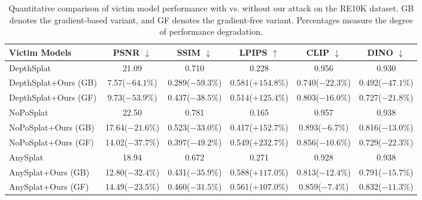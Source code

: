\begin{table}[h]
\centering
\caption{Quantitative comparison of victim model performance with vs. without our attack on the RE10K dataset. GB denotes the gradient-based variant, and GF denotes the gradient-free variant. Percentages measure the degree of performance degradation.}
\label{tab:re10k}
{\fontsize{7pt}{8pt}\selectfont
\begin{tabular}{l ccccc}
\toprule
Victim Models & \cellcolor{gray!20}PSNR $\downarrow$ & \cellcolor{gray!20}SSIM $\downarrow$ & \cellcolor{gray!20}LPIPS $\uparrow$ & \cellcolor{gray!20}CLIP $\downarrow$ & \cellcolor{gray!20}DINO $\downarrow$ \\
\midrule
DepthSplat           & 21.09 & 0.710 & 0.228 & 0.956 & 0.930 \\
DepthSplat+Ours (GB) & 7.57\textcolor[HTML]{B7282E}{\tiny($-64.1\%$)} & 0.289\textcolor[HTML]{B7282E}{\tiny($-59.3\%$)} & 0.581\textcolor[HTML]{B7282E}{\tiny($+154.8\%$)} & 0.740\textcolor[HTML]{B7282E}{\tiny($-22.3\%$)} & 0.492\textcolor[HTML]{B7282E}{\tiny($-47.1\%$)} \\
DepthSplat+Ours (GF) & 9.73\textcolor[HTML]{B7282E}{\tiny($-53.9\%$)}  & 0.437\textcolor[HTML]{B7282E}{\tiny($-38.5\%$)} & 0.514\textcolor[HTML]{B7282E}{\tiny($+125.4\%$)} & 0.803\textcolor[HTML]{B7282E}{\tiny($-16.0\%$)} & 0.727\textcolor[HTML]{B7282E}{\tiny($-21.8\%$)} \\
\midrule
NoPoSplat            & 22.50 & 0.781 & 0.165 & 0.957 & 0.938 \\
NoPoSplat+Ours (GB)  & 17.64\textcolor[HTML]{B7282E}{\tiny($-21.6\%$)} & 0.523\textcolor[HTML]{B7282E}{\tiny($-33.0\%$)} & 0.417\textcolor[HTML]{B7282E}{\tiny($+152.7\%$)} & 0.893\textcolor[HTML]{B7282E}{\tiny($-6.7\%$)} & 0.816\textcolor[HTML]{B7282E}{\tiny($-13.0\%$)} \\
NoPoSplat+Ours (GF)  & 14.02\textcolor[HTML]{B7282E}{\tiny($-37.7\%$)} & 0.397\textcolor[HTML]{B7282E}{\tiny($-49.2\%$)} & 0.549\textcolor[HTML]{B7282E}{\tiny($+232.7\%$)} & 0.856\textcolor[HTML]{B7282E}{\tiny($-10.6\%$)} & 0.729\textcolor[HTML]{B7282E}{\tiny($-22.3\%$)} \\
\midrule
AnySplat             & 18.94 & 0.672 & 0.271 & 0.928 & 0.938 \\
AnySplat+Ours (GB)   & 12.80\textcolor[HTML]{B7282E}{\tiny($-32.4\%$)} & 0.431\textcolor[HTML]{B7282E}{\tiny($-35.9\%$)} & 0.588\textcolor[HTML]{B7282E}{\tiny($+117.0\%$)} & 0.813\textcolor[HTML]{B7282E}{\tiny($-12.4\%$)} & 0.791\textcolor[HTML]{B7282E}{\tiny($-15.7\%$)} \\
AnySplat+Ours (GF)   & 14.49\textcolor[HTML]{B7282E}{\tiny($-23.5\%$)} & 0.460\textcolor[HTML]{B7282E}{\tiny($-31.5\%$)} & 0.561\textcolor[HTML]{B7282E}{\tiny($+107.0\%$)} & 0.859\textcolor[HTML]{B7282E}{\tiny($-7.4\%$)} & 0.832\textcolor[HTML]{B7282E}{\tiny($-11.3\%$)} \\
\bottomrule
\end{tabular}%
}
\end{table}

